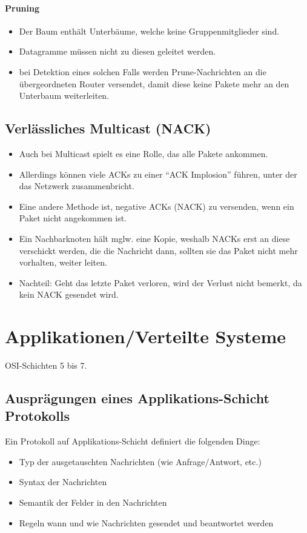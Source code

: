             \subsubsection{Pruning}
                \begin{itemize}
                	\item Der Baum enthält Unterbäume, welche keine Gruppenmitglieder sind.
                	\item Datagramme müssen nicht zu diesen geleitet werden.
                	\item bei Detektion eines solchen Falls werden Prune-Nachrichten an die übergeordneten Router versendet, damit diese keine Pakete mehr an den Unterbaum weiterleiten.
                \end{itemize}

    \section{Verlässliches Multicast (NACK)}
        \begin{itemize}
        	\item Auch bei Multicast spielt es eine Rolle, das alle Pakete ankommen.
        	\item Allerdings können viele ACKs zu einer \enquote{ACK Implosion} führen, unter der das Netzwerk zusammenbricht.
        	\item Eine andere Methode ist, negative ACKs (NACK) zu versenden, wenn ein Paket nicht angekommen ist.
        	\item Ein Nachbarknoten hält mglw. eine Kopie, weshalb NACKs erst an diese verschickt werden, die die Nachricht dann, sollten sie das Paket nicht mehr vorhalten, weiter leiten.
        	\item Nachteil: Geht das letzte Paket verloren, wird der Verlust nicht bemerkt, da kein NACK gesendet wird.
        \end{itemize}

\chapter{Applikationen/Verteilte Systeme}
    OSI-Schichten 5 bis 7.

    \section{Ausprägungen eines Applikations-Schicht Protokolls}
        Ein Protokoll auf Applikations-Schicht definiert die folgenden Dinge:
        \begin{itemize}
        	\item Typ der ausgetauschten Nachrichten (wie Anfrage/Antwort, etc.)
        	\item Syntax der Nachrichten
        	\item Semantik der Felder in den Nachrichten
        	\item Regeln wann und wie Nachrichten gesendet und beantwortet werden
        \end{itemize}

